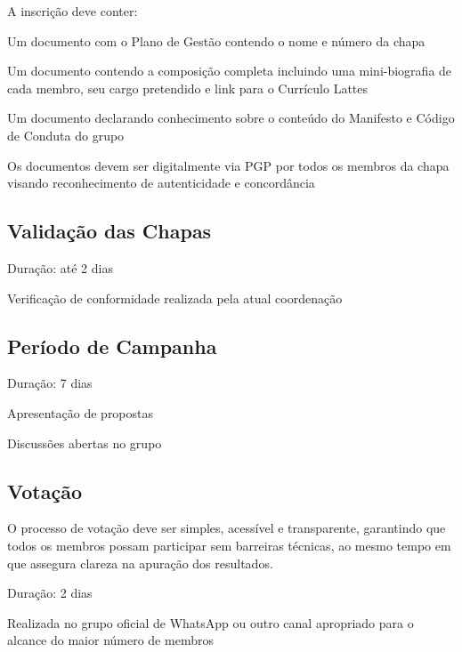 \documentclass[
  12pt,          %
  a4paper,       %
  oneside,       %
  brazil         %
]{article}
\begin{document}
A inscrição deve conter:

\begin{conduta}
	\item Um documento com o Plano de Gestão contendo o nome e número da chapa
	\item Um documento contendo a composição completa incluindo uma mini-biografia de cada membro, seu cargo pretendido e link para o Currículo Lattes
	\item Um documento declarando conhecimento sobre o conteúdo do Manifesto e Código de Conduta do grupo
	\item Os documentos devem ser digitalmente via PGP por todos os membros da chapa visando reconhecimento de autenticidade e concordância
\end{conduta}

\subsection{Validação das Chapas}

\begin{conduta}
	\item Duração: até 2 dias
	\item Verificação de conformidade realizada pela atual coordenação
\end{conduta}

\subsection{Período de Campanha}

\begin{conduta}
	\item Duração: 7 dias
	\item Apresentação de propostas
	\item Discussões abertas no grupo
\end{conduta}

\subsection{Votação}
O processo de votação deve ser simples, acessível e transparente, garantindo que todos os membros possam participar sem barreiras técnicas, ao mesmo tempo em 
que assegura clareza na apuração dos resultados.

\begin{conduta}
	\item Duração: 2 dias
	\item Realizada no grupo oficial de WhatsApp ou outro canal apropriado para o alcance do maior número de membros
\end{conduta}
\end{document}
